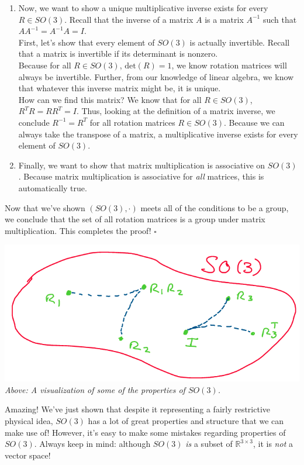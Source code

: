 \documentclass[oneside]{book}
\begin{document}
\begin{enumerate}
    \item Now, we want to show a unique multiplicative inverse exists for every $R \in SO(3)$. Recall that the inverse of a matrix $A$ is a matrix $A^{-1}$ such that $AA^{-1} = A^{-1}A = I$.\\
    First, let's show that every element of $SO(3)$ is actually invertible. Recall that a matrix is invertible if its determinant is nonzero. \\
    Because for all $R\in SO(3)$, $\mathrm{det}(R) = 1$, we know rotation matrices will always be invertible. Further, from our knowledge of linear algebra, we know that whatever this inverse matrix might be, it is unique.\\
    How can we find this matrix? We know that for all $R\in SO(3)$, $R^TR = RR^T = I$. Thus, looking at the definition of a matrix inverse, we conclude $R^{-1} = R^T$ for all rotation matrices $R \in SO(3)$. Because we can always take the transpose of a matrix, a multiplicative inverse exists for every element of $SO(3)$.
    
    \item Finally, we want to show that matrix multiplication is associative on $SO(3)$. Because matrix multiplication is associative for \textit{all} matrices, this is automatically true. 
\end{enumerate}
Now that we've shown $(SO(3), \cdot)$ meets all of the conditions to be a group, we conclude that the set of all rotation matrices is a group under matrix multiplication. This completes the proof! $\square$
\begin{center}
    \includegraphics[scale=0.3]{images/so3prop.png}\\
    \textit{Above: A visualization of some of the properties of $SO(3)$.}
\end{center}
Amazing! We've just shown that despite it representing a fairly restrictive physical idea, $SO(3)$ has a lot of great properties and structure that we can make use of! However, it's easy to make some mistakes regarding properties of $SO(3)$. Always keep in mind: although $SO(3)$ \textit{is} a subset of $\mathbb{R}^{3\times 3}$, it is \textit{not} a vector space!\\
\end{document}
